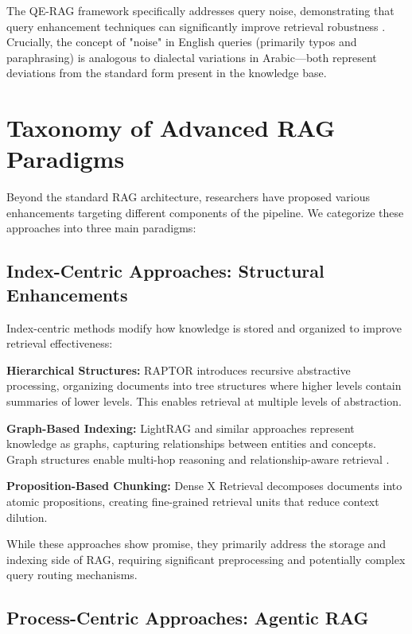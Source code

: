 The QE-RAG framework specifically addresses query noise, demonstrating that query enhancement techniques can significantly improve retrieval robustness \cite{zhang_2025_qerag}. Crucially, the concept of "noise" in English queries (primarily typos and paraphrasing) is analogous to dialectal variations in Arabic—both represent deviations from the standard form present in the knowledge base.

\section{Taxonomy of Advanced RAG Paradigms}

Beyond the standard RAG architecture, researchers have proposed various enhancements targeting different components of the pipeline. We categorize these approaches into three main paradigms:

\subsection{Index-Centric Approaches: Structural Enhancements}

Index-centric methods modify how knowledge is stored and organized to improve retrieval effectiveness:

\textbf{Hierarchical Structures:} RAPTOR \cite{sarthi_2024_raptor} introduces recursive abstractive processing, organizing documents into tree structures where higher levels contain summaries of lower levels. This enables retrieval at multiple levels of abstraction.

\textbf{Graph-Based Indexing:} LightRAG \cite{guo_2024_lightrag} and similar approaches represent knowledge as graphs, capturing relationships between entities and concepts. Graph structures enable multi-hop reasoning and relationship-aware retrieval \cite{han_2024_retrievalaugmented}.

\textbf{Proposition-Based Chunking:} Dense X Retrieval \cite{chen_2024_dense} decomposes documents into atomic propositions, creating fine-grained retrieval units that reduce context dilution.

While these approaches show promise, they primarily address the storage and indexing side of RAG, requiring significant preprocessing and potentially complex query routing mechanisms.

\subsection{Process-Centric Approaches: Agentic RAG}

